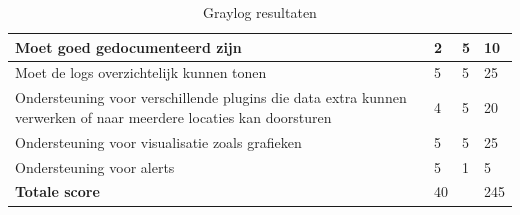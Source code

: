 \begin{table}[]
\begin{tabular}{| m{20em} | m{2cm} | m{2cm} | m{2cm} | }
        Moet goed gedocumenteerd zijn                                                                                     & 2                     & 5                   & 10                            \\ \hline
        Moet de logs overzichtelijk kunnen tonen                                                                          & 5                     & 5                   & 25                            \\ \hline
        Ondersteuning voor verschillende plugins die data extra kunnen verwerken of naar meerdere locaties kan doorsturen & 4                     & 5                   & 20                            \\ \hline
        Ondersteuning voor visualisatie zoals grafieken                                                                   & 5                     & 5                   & 25                            \\ \hline
        Ondersteuning voor alerts                                                                                         & 5                     & 1                   & 5                             \\ \hline
        \textbf{Totale score}                                                                                             & 40                    &                     & 245                           \\ \hline
    \end{tabular}
    \caption{Graylog resultaten}
    \label{tab:graylog-resultaten}
\end{table}